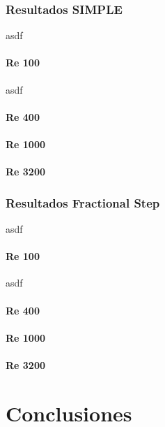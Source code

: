 \documentclass[a4paper,10pt, oneside]{book}
\begin{document}
\pagebreak

\subsection{Resultados SIMPLE}

asdf

\subsubsection{Re 100}

asdf

\subsubsection{Re 400}

\subsubsection{Re 1000}

\subsubsection{Re 3200}

\subsection{Resultados Fractional Step}

asdf

\subsubsection{Re 100}

asdf

\subsubsection{Re 400}

\subsubsection{Re 1000}

\subsubsection{Re 3200}

\chapter{Conclusiones}




\end{document}
